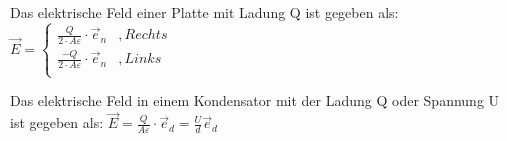 \beginbsp
Das elektrische Feld einer Platte mit Ladung Q ist gegeben als:
\formulaBegin
$\displaystyle \vec{E} = \begin{cases}
\frac{Q}{2\cdot A \varepsilon} \cdot \vec{e}_n & , Rechts \\
\frac{-Q}{2\cdot A \varepsilon} \cdot \vec{e}_n & , Links\\

\end{cases}
$
\formulaEnd
\begin{center}
\end{center}
\iend



\beginbsp
Das elektrische Feld in einem Kondensator mit der Ladung Q oder Spannung U ist gegeben als:
\formulaBegin
$\displaystyle \vec{E} = \frac{Q}{A\varepsilon} \cdot \vec{e}_d = \frac{U}{d	} \vec{e}_d$
\formulaEnd
\begin{center}
\end{center}
\iend
\newpage


